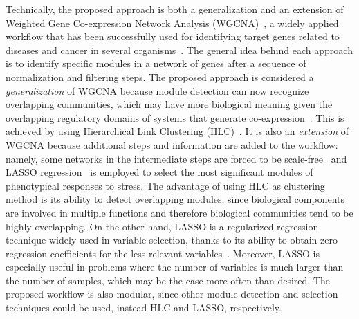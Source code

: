 Technically, the proposed approach is both a generalization and an
extension of Weighted Gene Co-expression Network Analysis
(WGCNA)~\cite{langfelder2008wgcna}, a widely applied workflow that has been
successfully used for identifying target genes related to diseases and
cancer in several organisms~\cite{tian2018identifying}. The general
idea behind each approach is to identify specific modules in a network
of genes after a sequence of normalization and filtering steps. The
proposed approach is considered a \textit{generalization} of WGCNA
because module detection can now recognize overlapping communities,
which may have more biological meaning given the overlapping
regulatory domains of systems that generate
co-expression~\cite{gaiteri2014beyond}. This is achieved by using
Hierarchical Link Clustering (HLC)~\cite{ahn2010link}. It is also an
\textit{extension} of WGCNA because additional steps and information
are added to the workflow: namely, some networks in the intermediate
steps are forced to be scale-free~\cite{todo3} and LASSO
regression~\cite{tibshirani1996regression} is employed to select the
most significant modules of phenotypical responses to stress.  The
advantage of using HLC as clustering method is its ability to detect
overlapping modules, since biological components are involved in
multiple functions and therefore biological communities tend to be
highly overlapping. On the other hand, LASSO is a regularized
regression technique widely used in variable selection, thanks to its
ability to obtain zero regression coefficients for the less relevant
variables~\cite{desboulets2018review}. Moreover, LASSO is especially
useful in problems where the number of variables is much larger than
the number of samples, which may be the case more often than desired.
The proposed workflow is also modular, since other module detection
and selection techniques could be used, instead HLC and LASSO,
respectively.


